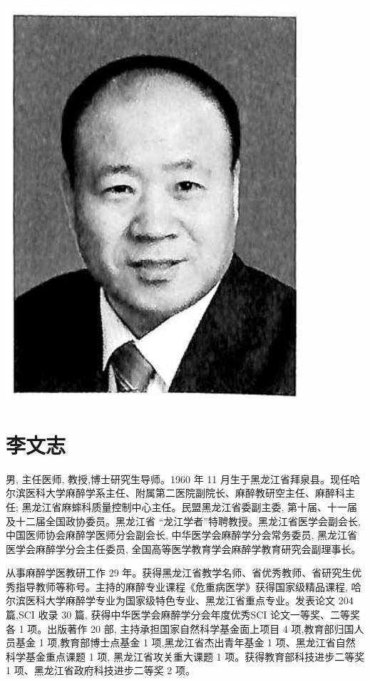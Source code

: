 \documentclass[10pt]{article}
\begin{document}
\begin{center}
\includegraphics[max width=\textwidth]{2024_07_09_002a177993bd97d1d6d7g-012}
\end{center}

\section*{李文志}
男, 主任医师, 教授,博士研究生导师。1960 年 11 月生于黑龙江省拜泉县。现任哈尔滨医科大学麻醉学系主任、附属第二医院副院长、麻醉教研空主任、麻醉科主任; 黑龙江省麻蟀科质量控制中心主任。民盟黑龙江省委副主委, 第十届、十一届及十二届全国政协委员。黑龙江省 “龙江学者”特聘教授。黑龙江省医学会副会长, 中国医师协会麻醉学医师分会副会长, 中华医学会麻醉学分会常务委员, 黑龙江省医学会麻醉学分会主任委员, 全国高等医学教育学会麻醉学教育研究会副理事长。

从事麻醉学医教研工作 29 年。获得黑龙江省教学名师、省优秀教师、省研究生优秀指导教师等称号。主持的麻醉专业课程《危重病医学》获得国家级精品课程, 哈尔滨医科大学麻醉学专业为国家级特色专业、黑龙江省重点专业。发表论文 204 篇,SCI 收录 30 篇, 获得中华医学会麻醉学分会年度优秀SCI 论文一等奖、二等奖各 1 项。出版著作 20 部, 主持承担国家自然科学基金面上项目 4 项,教育部归国人员基金 1 项,教育部博士点基金 1 项,黑龙江省杰出青年基金 1 项、黑龙江省自然科学基金重点课题 1 项, 黑龙江省攻关重大课题 1 项。获得教育部科技进步二等奖 1 项、黑龙江省政府科技进步二等奖 2 项。
\end{document}
